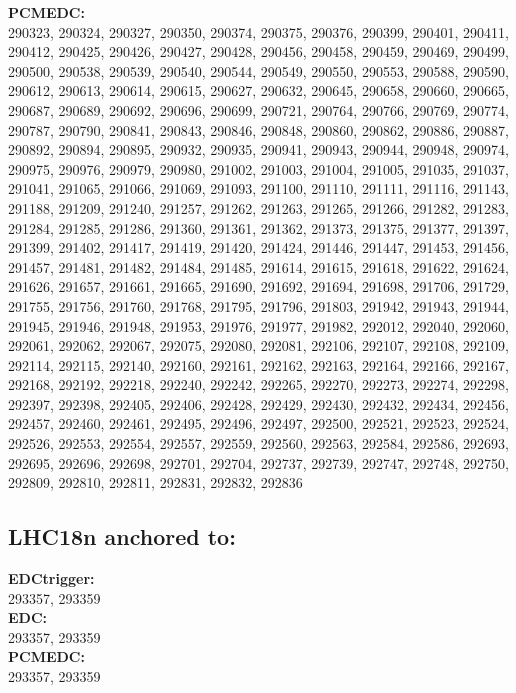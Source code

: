 \textbf{PCMEDC:}\\
290323, 290324, 290327, 290350, 290374, 290375, 290376, 290399, 290401, 290411, 290412, 290425, 290426, 290427, 290428, 290456, 290458, 290459, 290469, 290499, 290500, 290538, 290539, 290540, 290544, 290549, 290550, 290553, 290588, 290590, 290612, 290613, 290614, 290615, 290627, 290632, 290645, 290658, 290660, 290665, 290687, 290689, 290692, 290696, 290699, 290721, 290764, 290766, 290769, 290774, 290787, 290790, 290841, 290843, 290846, 290848, 290860, 290862, 290886, 290887, 290892, 290894, 290895, 290932, 290935, 290941, 290943, 290944, 290948, 290974, 290975, 290976, 290979, 290980, 291002, 291003, 291004, 291005, 291035, 291037, 291041, 291065, 291066, 291069, 291093, 291100, 291110, 291111, 291116, 291143, 291188, 291209, 291240, 291257, 291262, 291263, 291265, 291266, 291282, 291283, 291284, 291285, 291286, 291360, 291361, 291362, 291373, 291375, 291377, 291397, 291399, 291402, 291417, 291419, 291420, 291424, 291446, 291447, 291453, 291456, 291457, 291481, 291482, 291484, 291485, 291614, 291615, 291618, 291622, 291624, 291626, 291657, 291661, 291665, 291690, 291692, 291694, 291698, 291706, 291729, 291755, 291756, 291760, 291768, 291795, 291796, 291803, 291942, 291943, 291944, 291945, 291946, 291948, 291953, 291976, 291977, 291982, 292012, 292040, 292060, 292061, 292062, 292067, 292075, 292080, 292081, 292106, 292107, 292108, 292109, 292114, 292115, 292140, 292160, 292161, 292162, 292163, 292164, 292166, 292167, 292168, 292192, 292218, 292240, 292242, 292265, 292270, 292273, 292274, 292298, 292397, 292398, 292405, 292406, 292428, 292429, 292430, 292432, 292434, 292456, 292457, 292460, 292461, 292495, 292496, 292497, 292500, 292521, 292523, 292524, 292526, 292553, 292554, 292557, 292559, 292560, 292563, 292584, 292586, 292693, 292695, 292696, 292698, 292701, 292704, 292737, 292739, 292747, 292748, 292750, 292809, 292810, 292811, 292831, 292832, 292836 \\

 \subsection{LHC18n anchored to:  }

 \textbf{EDCtrigger:}\\
 293357, 293359\\

 \textbf{EDC:}\\
 293357, 293359\\

 \textbf{PCMEDC:}\\
293357, 293359\\

